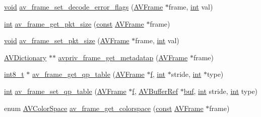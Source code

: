 \begin{DoxyCompactItemize}
\item 
\hyperlink{sound_8c_ae35f5844602719cf66324f4de2a658b3}{void} \hyperlink{group__lavu__frame_ga0060b8c9949b28790013039e70d830f2}{av\+\_\+frame\+\_\+set\+\_\+decode\+\_\+error\+\_\+flags} (\hyperlink{struct_a_v_frame}{A\+V\+Frame} $\ast$frame, \hyperlink{xmltok_8h_a5a0d4a5641ce434f1d23533f2b2e6653}{int} val)
\item 
\hyperlink{xmltok_8h_a5a0d4a5641ce434f1d23533f2b2e6653}{int} \hyperlink{group__lavu__frame_ga03e2090721bb5d66f292090c7e7e2524}{av\+\_\+frame\+\_\+get\+\_\+pkt\+\_\+size} (\hyperlink{getopt1_8c_a2c212835823e3c54a8ab6d95c652660e}{const} \hyperlink{struct_a_v_frame}{A\+V\+Frame} $\ast$frame)
\item 
\hyperlink{sound_8c_ae35f5844602719cf66324f4de2a658b3}{void} \hyperlink{group__lavu__frame_ga12742a052df91eeb22a0062cf3da0504}{av\+\_\+frame\+\_\+set\+\_\+pkt\+\_\+size} (\hyperlink{struct_a_v_frame}{A\+V\+Frame} $\ast$frame, \hyperlink{xmltok_8h_a5a0d4a5641ce434f1d23533f2b2e6653}{int} val)
\item 
\hyperlink{group__lavu__dict_ga1d7cc0833bee918994a600556410315f}{A\+V\+Dictionary} $\ast$$\ast$ \hyperlink{group__lavu__frame_gae3797588a2664e4d1cc137b7aaf67b1c}{avpriv\+\_\+frame\+\_\+get\+\_\+metadatap} (\hyperlink{struct_a_v_frame}{A\+V\+Frame} $\ast$frame)
\item 
\hyperlink{lib-src_2ffmpeg_2win32_2stdint_8h_a27eddd12ef1271a2ea8629e1148e7e63}{int8\+\_\+t} $\ast$ \hyperlink{group__lavu__frame_ga3072a9eafc1dba9df289a9aac2dcb083}{av\+\_\+frame\+\_\+get\+\_\+qp\+\_\+table} (\hyperlink{struct_a_v_frame}{A\+V\+Frame} $\ast$\hyperlink{checksum_8c_ae747d72a1a803f5ff4a4b2602857d93b}{f}, \hyperlink{xmltok_8h_a5a0d4a5641ce434f1d23533f2b2e6653}{int} $\ast$stride, \hyperlink{xmltok_8h_a5a0d4a5641ce434f1d23533f2b2e6653}{int} $\ast$type)
\item 
\hyperlink{xmltok_8h_a5a0d4a5641ce434f1d23533f2b2e6653}{int} \hyperlink{group__lavu__frame_ga4021d1fbc36d31bcaa986aa6217624c5}{av\+\_\+frame\+\_\+set\+\_\+qp\+\_\+table} (\hyperlink{struct_a_v_frame}{A\+V\+Frame} $\ast$\hyperlink{checksum_8c_ae747d72a1a803f5ff4a4b2602857d93b}{f}, \hyperlink{struct_a_v_buffer_ref}{A\+V\+Buffer\+Ref} $\ast$\hyperlink{xlstr_8c_a781718f5b53a876fe91c424c4607fa8f}{buf}, \hyperlink{xmltok_8h_a5a0d4a5641ce434f1d23533f2b2e6653}{int} stride, \hyperlink{xmltok_8h_a5a0d4a5641ce434f1d23533f2b2e6653}{int} type)
\item 
enum \hyperlink{ffmpeg_2libavutil_2frame_8h_aff71a069509a1ad3ff54d53a1c894c85}{A\+V\+Color\+Space} \hyperlink{group__lavu__frame_ga03224acf06cbd666f3878a2c35b3f704}{av\+\_\+frame\+\_\+get\+\_\+colorspace} (\hyperlink{getopt1_8c_a2c212835823e3c54a8ab6d95c652660e}{const} \hyperlink{struct_a_v_frame}{A\+V\+Frame} $\ast$frame)
$$
\end{DoxyCompactItemize}
